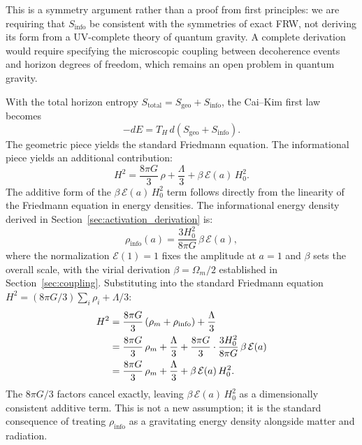 \documentclass[11pt]{article}
\begin{document}
This is a symmetry argument rather than a proof from first principles: we are
requiring that $S_\mathrm{info}$ be consistent with the symmetries of exact FRW,
not deriving its form from a UV-complete theory of quantum gravity.  A complete
derivation would require specifying the microscopic coupling between decoherence
events and horizon degrees of freedom, which remains an open problem in quantum
gravity.


With the total horizon entropy
$S_\mathrm{total} = S_\mathrm{geo} + S_\mathrm{info}$,
the Cai--Kim first law becomes
\begin{equation}
-dE = T_H\,d(S_\mathrm{geo} + S_\mathrm{info}).
\label{eq:modified_first_law}
\end{equation}
The geometric piece yields the standard Friedmann equation.  The
informational piece yields an additional contribution:
\begin{equation}
H^2 = \frac{8\pi G}{3}\,\rho + \frac{\Lambda}{3}
  + \beta\,\mathcal{E}(a)\,H_0^2.
\label{eq:modified_friedmann}
\end{equation}
The additive form of the $\beta\,\mathcal{E}(a)\,H_0^2$ term follows
directly from the linearity of the Friedmann equation in energy densities.
The informational energy density derived in
Section~\ref{sec:activation_derivation} is:
\begin{equation}
\rho_\mathrm{info}(a) = \frac{3H_0^2}{8\pi G}\,\beta\,\mathcal{E}(a),
\label{eq:rho_info_explicit}
\end{equation}
where the normalization $\mathcal{E}(1) = 1$ fixes the amplitude at $a = 1$
and $\beta$ sets the overall scale, with the virial derivation
$\beta = \Omega_m/2$ established in Section~\ref{sec:coupling}.  Substituting into the
standard Friedmann equation $H^2 = (8\pi G/3)\sum_i \rho_i + \Lambda/3$:
\begin{align}
H^2 &= \frac{8\pi G}{3}\,(\rho_m + \rho_\mathrm{info}) + \frac{\Lambda}{3}
  \notag\\
    &= \frac{8\pi G}{3}\,\rho_m + \frac{\Lambda}{3}
       + \frac{8\pi G}{3}\cdot\frac{3H_0^2}{8\pi G}\,\beta\,\mathcal{E}(a)
  \notag\\
    &= \frac{8\pi G}{3}\,\rho_m + \frac{\Lambda}{3}
       + \beta\,\mathcal{E}(a)\,H_0^2.
\label{eq:modified_friedmann_explicit}
\end{align}
The $8\pi G/3$ factors cancel exactly, leaving $\beta\,\mathcal{E}(a)\,H_0^2$
as a dimensionally consistent additive term.  This is not a new assumption;
it is the standard consequence of treating $\rho_\mathrm{info}$ as a
gravitating energy density alongside matter and radiation.
\end{document}
